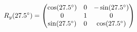 \documentclass[preview]{standalone}
\begin{document}
\begin{align*}
\special{dvisvgm:raw <g id='unique000'>}R_y(27.5^\circ) = \begin{pmatrix} \cos(27.5^\circ) & 0 & -\sin(27.5^\circ) \\ 0 & 1 & 0 \\ \sin(27.5^\circ) & 0 & \cos(27.5^\circ) \end{pmatrix}\special{dvisvgm:raw </g>}
\end{align*}
\end{document}
